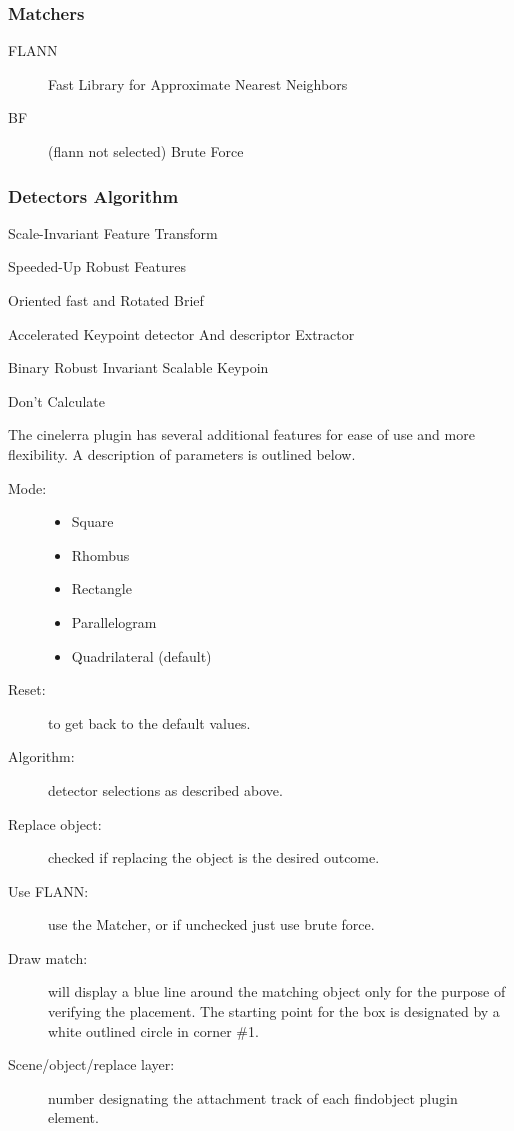 \subsubsection*{Matchers}%
\label{ssub:matchers}

\begin{description}
    \item[FLANN] Fast Library for Approximate Nearest Neighbors
    \item[BF] (flann not selected) Brute Force
\end{description}

\subsubsection*{Detectors Algorithm}%
\label{ssub:detectors_algorithm}

\begin{description}
    \item[SIFT] Scale-Invariant Feature Transform
    \item[SURF] Speeded-Up Robust Features
    \item[ORB] Oriented fast and Rotated Brief
    \item[AKAZE] Accelerated Keypoint detector And descriptor Extractor
    \item[BRISK] Binary Robust Invariant Scalable Keypoin
    \item Don’t Calculate
\end{description}

The cinelerra plugin has several additional features for ease of use and more flexibility. A description of parameters is outlined below.

\begin{description}
    \item[Mode:] 
    \begin{itemize}[noitemsep]
        \item Square
        \item Rhombus
        \item Rectangle
        \item Parallelogram
        \item Quadrilateral (default)
    \end{itemize}
    \item[Reset:] to get back to the default values.
    \item[Algorithm:] detector selections as described above.
    \item[Replace object:] checked if replacing the object is the desired outcome.
    \item[Use FLANN:] use the Matcher, or if unchecked just use brute force.
    \item[Draw match:] will display a blue line around the matching object only for the purpose of verifying the placement. The starting point for the box is designated by a white outlined circle in corner \#1.
    \item[Scene/object/replace layer:] number designating the attachment track of each findobject plugin element.
\end{description}

